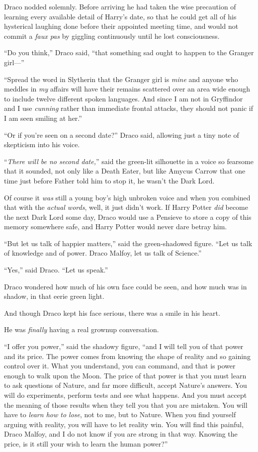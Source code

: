Draco nodded solemnly. Before arriving he had taken the wise precaution of learning every available detail of Harry’s date, so that he could get all of his hysterical laughing done before their appointed meeting time, and would not commit a \emph{faux pas} by giggling continuously until he lost consciousness.

“Do you think,” Draco said, “that something sad ought to happen to the Granger girl—”

“Spread the word in Slytherin that the Granger girl is \emph{mine} and anyone who meddles in \emph{my} affairs will have their remains scattered over an area wide enough to include twelve different spoken languages. And since I am not in Gryffindor and I use \emph{cunning} rather than immediate frontal attacks, they should not panic if I am seen smiling at her.”

“Or if you’re seen on a second date?” Draco said, allowing just a tiny note of skepticism into his voice.

“\emph{There will be no second date,}” said the green-lit silhouette in a voice so fearsome that it sounded, not only like a Death Eater, but like Amycus Carrow that one time just before Father told him to stop it, he wasn’t the Dark Lord.

Of course it \emph{was} still a young boy’s high unbroken voice and when you combined that with the \emph{actual words}, well, it just didn’t work. If Harry Potter \emph{did} become the next Dark Lord some day, Draco would use a Pensieve to store a copy of this memory somewhere safe, and Harry Potter would never dare betray him.

“But let us talk of happier matters,” said the green-shadowed figure. “Let us talk of knowledge and of power. Draco Malfoy, let us talk of Science.”

“Yes,” said Draco. “Let us speak.”

Draco wondered how much of his own face could be seen, and how much was in shadow, in that eerie green light.

And though Draco kept his face serious, there was a smile in his heart.

He was \emph{finally} having a real grownup conversation.

“I offer you power,” said the shadowy figure, “and I will tell you of that power and its price. The power comes from knowing the shape of reality and so gaining control over it. What you understand, you can command, and that is power enough to walk upon the Moon. The price of that power is that you must learn to ask questions of Nature, and far more difficult, accept Nature’s answers. You will do experiments, perform tests and see what happens. And you must accept the meaning of those results when they tell you that you are mistaken. You will have to \emph{learn how to lose}, not to me, but to Nature. When you find yourself arguing with reality, you will have to let reality win. You will find this painful, Draco Malfoy, and I do not know if you are strong in that way. Knowing the price, is it still your wish to learn the human power?”

